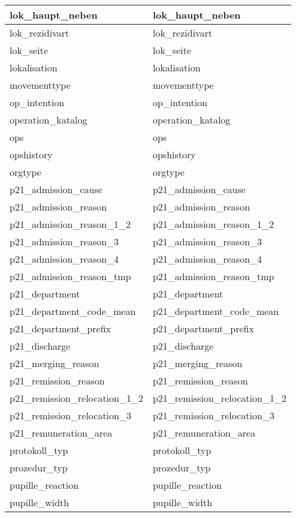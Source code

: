 \begin{longtable}{||p{5.3cm}|p{8.5cm}||}
  	lok\_haupt\_neben & lok\_haupt\_neben\\ \hline
  	lok\_rezidivart & lok\_rezidivart\\ \hline
  	lok\_seite & lok\_seite\\ \hline
  	lokalisation & lokalisation\\ \hline
  	movementtype & movementtype\\ \hline
  	op\_intention & op\_intention\\ \hline
  	operation\_katalog & operation\_katalog\\ \hline
  	ops & ops\\ \hline
  	opshistory & opshistory\\ \hline
  	orgtype & orgtype\\ \hline
  	p21\_admission\_cause & p21\_admission\_cause\\ \hline
  	p21\_admission\_reason & p21\_admission\_reason\\ \hline
  	p21\_admission\_reason\_1\_2 & p21\_admission\_reason\_1\_2\\ \hline
  	p21\_admission\_reason\_3 & p21\_admission\_reason\_3\\ \hline
  	p21\_admission\_reason\_4 & p21\_admission\_reason\_4\\ \hline
  	p21\_admission\_reason\_tmp & p21\_admission\_reason\_tmp\\ \hline
  	p21\_department & p21\_department\\ \hline
  	p21\_department\_code\_mean & p21\_department\_code\_mean\\ \hline
  	p21\_department\_prefix & p21\_department\_prefix\\ \hline
  	p21\_discharge & p21\_discharge\\ \hline
  	p21\_merging\_reason & p21\_merging\_reason\\ \hline
  	p21\_remission\_reason & p21\_remission\_reason\\ \hline
  	p21\_remission\_relocation\_1\_2 & p21\_remission\_relocation\_1\_2\\ \hline
  	p21\_remission\_relocation\_3 & p21\_remission\_relocation\_3\\ \hline
  	p21\_remuneration\_area & p21\_remuneration\_area\\ \hline
  	protokoll\_typ & protokoll\_typ\\ \hline
  	prozedur\_typ & prozedur\_typ\\ \hline
  	pupille\_reaction & pupille\_reaction\\ \hline
  	pupille\_width & pupille\_width\\ \hline

\end{longtable}
